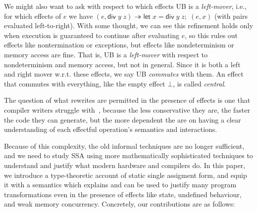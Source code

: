 \documentclass[acmsmall,screen,review]{acmart}
\newcommand{\ms}[1]{\ensuremath{\mathsf{#1}}}
\newcommand{\letexpr}[3]{\ensuremath{\ms{let}\;#1 = #2;\;#3}}
\newcommand{\tref}{\twoheadrightarrow}
\begin{document}
We might also want to ask with respect to which effects UB is a \emph{left-mover}, i.e., for which
effects of $e$ we have $(e, \ms{div}\;y\;z) \tref \letexpr{x}{\ms{div}\;y\;z}{(e, x)}$ (with pairs
evaluated left-to-right). With some thought, we can see this refinement holds only when execution is
guaranteed to continue after evaluating $e$, so this rules out effects like nontermination or
exceptions, but effects like nondeterminism or memory access are fine. That is, UB is a
\emph{left-mover} with respect to nondeterminism and memory access, but not in general. Since it is
both a left and right mover w.r.t. these effects, we say UB \emph{commutes} with them. An effect
that commutes with everything, like the empty effect $\bot$, is called \emph{central}.





The question of what rewrites are permitted in the presence of effects is one that compiler
writers struggle with~\cite{llvm-github}, because the less conservative they are, the faster
the code they can generate, but the more dependent the are on having a clear understanding of each
effectful operation's semantics and interactions. 

Because of this complexity, the old informal techniques are no longer sufficient, and we need to
study SSA using more mathematically sophisticated techniques to understand and justify what modern
hardware and compilers do. In this paper, we introduce a type-theoretic account of static single
assigment form, and equip it with a semantics which explains and can be used to justify many program
transformations even in the presence of effects like state, undefined behaviour, and weak memory concurrency. Concretely, our contributions are as follows:
\end{document}
